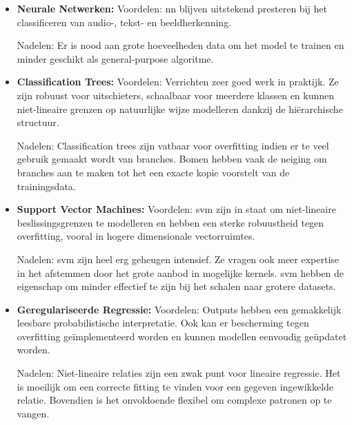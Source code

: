 	\begin{itemize}
		\item \textbf{Neurale Netwerken:}
			\subitem Voordelen: \gls{nn} blijven uitstekend presteren bij het classificeren van audio-, tekst- en beeldherkenning.
			
			\subitem Nadelen: Er is nood aan grote hoeveelheden data om het model te trainen en minder geschikt als general-purpose algoritme.
			
		\item \textbf{Classification Trees:}
			\subitem Voordelen: Verrichten zeer goed werk in praktijk. Ze zijn robuust voor uitschieters, schaalbaar voor meerdere klassen en kunnen niet-lineaire grenzen op natuurlijke wijze modelleren dankzij de hi\"erarchische structuur.
			
			\subitem Nadelen: Classification trees zijn vatbaar voor overfitting indien er te veel gebruik gemaakt wordt van branches. Bomen hebben vaak de neiging om branches aan te maken tot het een exacte kopie voorstelt van de trainingsdata.
			
		\item \textbf{Support Vector Machines:}
			\subitem Voordelen: \gls{svm} zijn in staat om niet-lineaire beslissingsgrenzen te modelleren en hebben een sterke robuustheid tegen overfitting, vooral in hogere dimensionale vectorruimtes.
			
			\subitem Nadelen: \gls{svm} zijn heel erg geheugen intensief. Ze vragen ook meer expertise in het afstemmen door het grote aanbod in mogelijke kernels. \gls{svm} hebben de eigenschap om minder effectief te zijn bij het schalen naar grotere datasets. 
			
		\item \textbf{Geregulariseerde Regressie:}		
			\subitem Voordelen: Outputs hebben een  gemakkelijk leesbare probabilistische interpretatie. Ook kan er bescherming tegen overfitting ge\"implementeerd worden en kunnen modellen eenvoudig ge\"updatet worden.
			
			\subitem Nadelen: Niet-lineaire relaties zijn een zwak punt voor lineaire regressie. Het is moeilijk om een correcte fitting te vinden voor een gegeven ingewikkelde relatie. Bovendien is het onvoldoende flexibel om complexe patronen op te vangen.

			
	\end{itemize}

